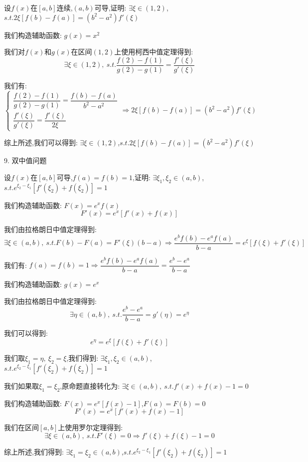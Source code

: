 \begin{proposition}
	设$f(x)$在$[a,b]$连续,$(a,b)$可导,证明: $\exists \xi\in(1,2)$,$s.t. 2\xi[f(b)-f(a)]=(b^2-a^2)f'(\xi)$
\end{proposition}
\begin{solution}

	我们构造辅助函数: $g(x)=x^2$

	我们对$f(x)$和$g(x)$在区间$(1,2)$上使用柯西中值定理得到:
	$$\exists\xi\in(1,2),\ s.t. \dfrac{f(2)-f(1)}{g(2)-g(1)}=\dfrac{f'(\xi)}{g'(\xi)}$$

	我们有:
	$$\left\lbrace
		\begin{array}{l}
			\dfrac{f(2)-f(1)}{g(2)-g(1)}=\dfrac{f(b)-f(a)}{b^2-a^2} \\
			\dfrac{f'(\xi)}{g'(\xi)}=\dfrac{f'(\xi)}{2\xi}
		\end{array}
		\right. \Rightarrow 2\xi[f(b)-f(a)]=(b^2-a^2)f'(\xi)$$

	综上所述,我们可以得到: $\exists \xi\in(1,2)$,$s.t. 2\xi[f(b)-f(a)]=(b^2-a^2)f'(\xi)$
\end{solution}


9. 双中值问题

\begin{proposition}
	设$f(x)$在$[a,b]$可导,$f(a)=f(b)=1$,证明: $\exists \xi_{1},\xi_{2}\in(a,b)$,$s.t. e^{\xi_{2}-\xi_{1}}[f'(\xi_{2})+f(\xi_{2})]=1$
\end{proposition}
\begin{solution}

	我们构造辅助函数: $F(x)=e^xf(x)$
	$$F'(x)=e^x[f'(x)+f(x)]$$

	我们由拉格朗日中值定理得到:
	$$\exists\xi\in(a,b),\ s.t. F(b)-F(a)=F'(\xi)(b-a)\Rightarrow \dfrac{e^bf(b)-e^af(a)}{b-a}=e^{\xi}[f(\xi)+f'(\xi)]$$

	我们有: $f(a)=f(b)=1\Rightarrow \dfrac{e^bf(b)-e^af(a)}{b-a}=\dfrac{e^b-e^a}{b-a}$

	我们构造辅助函数: $g(x)=e^x$

	我们由拉格朗日中值定理得到:
	$$\exists\eta\in(a,b),\ s.t. \dfrac{e^b-e^a}{b-a}=g'(\eta)=e^{\eta}$$

	我们可以得到:
	$$e^{\eta}=e^{\xi}[f(\xi)+f'(\xi)]$$

	我们取$\xi_{1}=\eta,\ \xi_{2}=\xi$,我们得到: $\exists \xi_{1},\xi_{2}\in(a,b)$,$s.t. e^{\xi_{2}-\xi_{1}}[f'(\xi_{2})+f(\xi_{2})]=1$
\end{solution}
\begin{anymark}[注]
	我们如果取$\xi_{1}=\xi_{2}$,原命题直接转化为: $\exists\xi\in(a,b),\ s.t. f'(x)+f(x)-1=0$

	我们构造辅助函数: $F(x)=e^x[f(x)-1]$,$F(a)=F(b)=0$
	$$F'(x)=e^{x}[f'(x)+f(x)-1]$$

	我们在区间$[a,b]$上使用罗尔定理得到:
	$$\exists\xi\in(a,b),\ s.t. F'(\xi)=0\Rightarrow f'(\xi)+f(\xi)-1=0$$

	综上所述,我们得到: $\exists \xi_{1}=\xi_{2}\in(a,b)$,$s.t. e^{\xi_{2}-\xi_{1}}[f'(\xi_{2})+f(\xi_{2})]=1$
\end{anymark}

